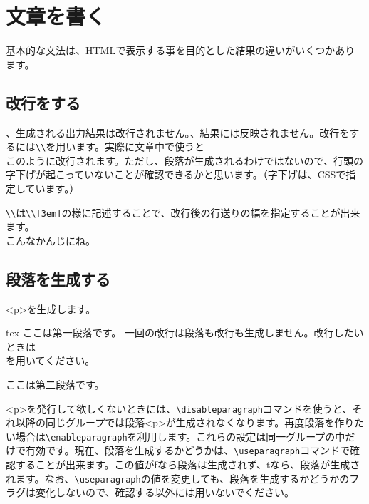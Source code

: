 \chapter{文章を書く}
基本的な文法は、HTMLで表示する事を目的とした結果の違いがいくつかあります。

\chapternav


\section{改行をする}
、生成される出力結果は改行されません。、結果には反映されません。改行をするには{\color{red}\verb+\\+}を用います。実際に文章中で使うと\\
このように改行されます。ただし、段落が生成されるわけではないので、行頭の字下げが起こっていないことが確認できるかと思います。{\color{green}（字下げは、CSSで指定しています。）}

\verb+\\+は\verb+\\[3em]+の様に記述することで、改行後の行送りの幅を指定することが出来ます。\\[3em]
こんなかんじにね。


\section{段落を生成する}
<p>を生成します。

\begin{code}{tex}
ここは第一段落です。
一回の改行は段落も改行も生成しません。改行したいときは\\を用いてください。

ここは第二段落です。
\end{code}

\vspace{2em}

<p>を発行して欲しくないときには、{\color{red}\verb+\disableparagraph+}コマンドを使うと、それ以降の同じグループでは段落<p>が生成されなくなります。再度段落を作りたい場合は{\color{red}\verb+\enableparagraph+}を利用します。これらの設定は同一グループの中だけで有効です。現在、段落を生成するかどうかは、\verb+\useparagraph+コマンドで確認することが出来ます。この値がfなら段落は生成されず、tなら、段落が生成されます。なお、\verb+\useparagraph+の値を変更しても、段落を生成するかどうかのフラグは変化しないので、確認する以外には用いないでください。

